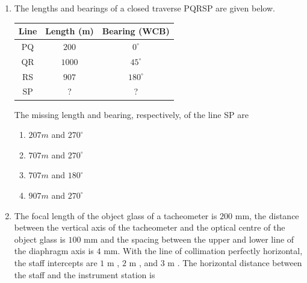 \documentclass[journal]{IEEEtran}
\begin{document}
\begin{enumerate}
\item The lengths and bearings of a closed traverse PQRSP are given below.

\vspace{0.3cm}

\begin{tabular}{|c|c|c|}
\hline
Line & Length (m) & Bearing (WCB) \\
\hline
PQ & $200$ & $0^\circ$ \\
QR & $1000$ & $45^\circ$ \\
RS & $907$ & $180^\circ$ \\
SP & ? & ? \\
\hline
\end{tabular}

\vspace{0.5cm}

The missing length and bearing, respectively, of the line SP are \hfill {}

\begin{enumerate}
\item $207 m$ and $270^\circ$
\item $707 m$ and $270^\circ$
\item $707 m$ and $180^\circ$
\item $907 m$ and $270^\circ$
\end{enumerate}

\item The focal length of the object glass of a tacheometer is $200$ mm, the distance between the vertical axis of the tacheometer and the optical centre of the object glass is $100$ mm and the spacing between the upper and lower line of the diaphragm axis is $4$ mm. With the line of collimation perfectly horizontal, the staff intercepts are $1$ m , $2$ m , and $3$ m . The horizontal distance  between the staff and the instrument station is \hfill {}
\begin{enumerate}
\end{enumerate}


\end{enumerate}
\end{document}
